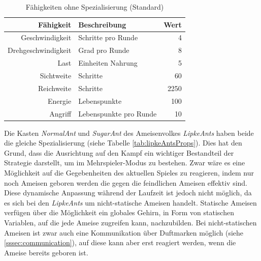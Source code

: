 \begin{table}[hbt]
\centering
\begin{minipage}[t]{.7\textwidth} %
\caption{Fähigkeiten ohne Spezialisierung (Standard)} %
\begin{tabularx}{\columnwidth}{rXr}
\toprule
Fähigkeit & Beschreibung & Wert\\
\midrule
Geschwindigkeit & Schritte pro Runde & 4\\
Drehgeschwindigkeit & Grad pro Runde & 8\\
Last & Einheiten Nahrung & 5\\
Sichtweite & Schritte & 60\\
Reichweite & Schritte & 2250\\
Energie & Lebenspunkte & 100\\
Angriff & Lebenspunkte pro Runde & 10\\
\bottomrule
\end{tabularx}
\label{tab:standardProps}
\end{minipage}
\end{table}

Die Kasten \textit{NormalAnt} und \textit{SugarAnt} des Ameisenvolkes \textit{LipkeAnts} haben beide die gleiche Spezialisierung (siehe Tabelle \ref{tab:lipkeAntsProps}). Dies hat den Grund, dass die Ausrichtung auf den Kampf ein wichtiger Bestandteil der Strategie darstellt, um im Mehrspieler-Modus zu bestehen. Zwar wäre es eine Möglichkeit auf die Gegebenheiten des aktuellen Spieles zu reagieren, indem nur noch Ameisen geboren werden die gegen die feindlichen Ameisen effektiv sind. Diese dynamische Anpassung während der Laufzeit ist jedoch nicht möglich, da es sich bei den \textit{LipkeAnts} um nicht-statische Ameisen handelt. Statische Ameisen verfügen über die Möglichkeit ein globales Gehirn, in Form von statischen Variablen, auf die jede Ameise zugreifen kann, nachzubilden. Bei nicht-statischen Ameisen ist zwar auch eine Kommunikation über Duftmarken möglich (siehe \ref{sssec:communication}), auf diese kann aber erst reagiert werden, wenn die Ameise bereits geboren ist.

